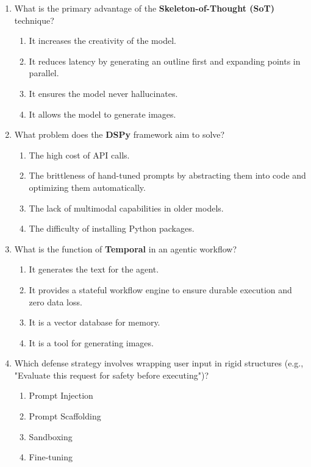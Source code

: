 \documentclass[11pt,a4paper]{article}
\begin{document}
\begin{enumerate}[leftmargin=*, label=\textbf{\#\arabic*}]
  \item What is the primary advantage of the \textbf{Skeleton-of-Thought (SoT)} technique?
    \begin{enumerate}[label=\Alph*)]
      \item It increases the creativity of the model.
      \item It reduces latency by generating an outline first and expanding points in parallel.
      \item It ensures the model never hallucinates.
      \item It allows the model to generate images.
    \end{enumerate}

  \item What problem does the \textbf{DSPy} framework aim to solve?
    \begin{enumerate}[label=\Alph*)]
      \item The high cost of API calls.
      \item The brittleness of hand-tuned prompts by abstracting them into code and optimizing them automatically.
      \item The lack of multimodal capabilities in older models.
      \item The difficulty of installing Python packages.
    \end{enumerate}

  \item What is the function of \textbf{Temporal} in an agentic workflow?
    \begin{enumerate}[label=\Alph*)]
      \item It generates the text for the agent.
      \item It provides a stateful workflow engine to ensure durable execution and zero data loss.
      \item It is a vector database for memory.
      \item It is a tool for generating images.
    \end{enumerate}

  \item Which defense strategy involves wrapping user input in rigid structures (e.g., "Evaluate this request for safety before executing")?
    \begin{enumerate}[label=\Alph*)]
      \item Prompt Injection
      \item Prompt Scaffolding
      \item Sandboxing
      \item Fine-tuning
    \end{enumerate}


\end{enumerate}
\end{document}
